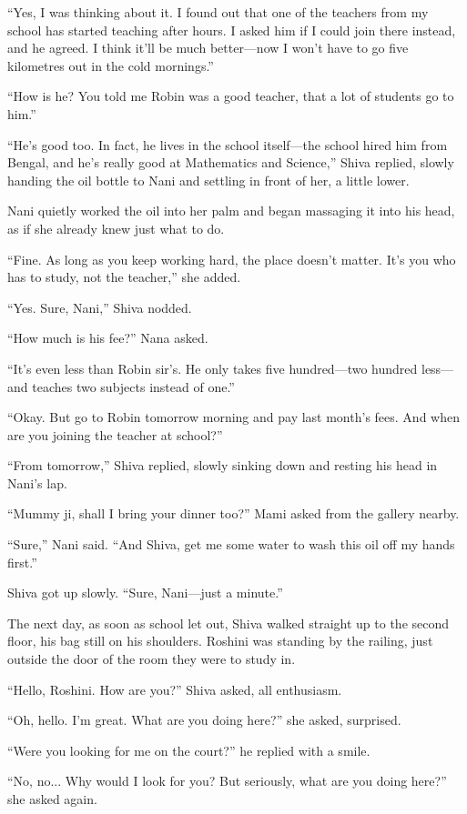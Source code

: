 ``Yes, I was thinking about it. I found out that one of the teachers from my school has started teaching after hours. I asked him if I could join there instead, and he agreed. I think it'll be much better—now I won't have to go five kilometres out in the cold mornings.''

``How is he? You told me Robin was a good teacher, that a lot of students go to him.''

``He's good too. In fact, he lives in the school itself—the school hired him from Bengal, and he's really good at Mathematics and Science,'' Shiva replied, slowly handing the oil bottle to Nani and settling in front of her, a little lower.

Nani quietly worked the oil into her palm and began massaging it into his head, as if she already knew just what to do.

``Fine. As long as you keep working hard, the place doesn't matter. It's you who has to study, not the teacher,'' she added.

``Yes. Sure, Nani,'' Shiva nodded.

``How much is his fee?'' Nana asked.

``It's even less than Robin sir's. He only takes five hundred—two hundred less—and teaches two subjects instead of one.''

``Okay. But go to Robin tomorrow morning and pay last month's fees. And when are you joining the teacher at school?''

``From tomorrow,'' Shiva replied, slowly sinking down and resting his head in Nani's lap.

``Mummy ji, shall I bring your dinner too?'' Mami asked from the gallery nearby.

``Sure,'' Nani said. ``And Shiva, get me some water to wash this oil off my hands first.''

Shiva got up slowly. ``Sure, Nani—just a minute.''

The next day, as soon as school let out, Shiva walked straight up to the second floor, his bag still on his shoulders. Roshini was standing by the railing, just outside the door of the room they were to study in.

``Hello, Roshini. How are you?'' Shiva asked, all enthusiasm.

``Oh, hello. I'm great. What are you doing here?'' she asked, surprised.

``Were you looking for me on the court?'' he replied with a smile.

``No, no... Why would I look for you? But seriously, what are you doing here?'' she asked again.

